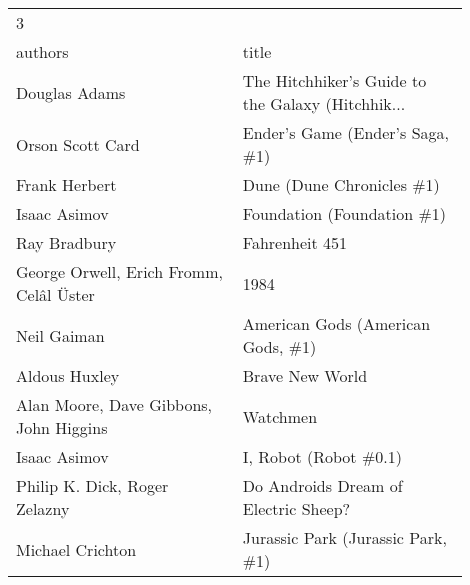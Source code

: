 \begin{tabular}{p{0.45\linewidth}p{0.45\linewidth}}
\toprule
                                       3 \\
                                 authors &                                              title \\
\midrule
                           Douglas Adams &  The Hitchhiker's Guide to the Galaxy (Hitchhik... \\
                        Orson Scott Card &                    Ender's Game (Ender's Saga, \#1) \\
                           Frank Herbert &                          Dune (Dune Chronicles \#1) \\
                            Isaac Asimov &                         Foundation (Foundation \#1) \\
                            Ray Bradbury &                                     Fahrenheit 451 \\
 George Orwell, Erich Fromm, Celâl Üster &                                               1984 \\
                             Neil Gaiman &                  American Gods (American Gods, \#1) \\
                           Aldous Huxley &                                    Brave New World \\
  Alan Moore, Dave Gibbons, John Higgins &                                           Watchmen \\
                            Isaac Asimov &                              I, Robot (Robot \#0.1) \\
           Philip K. Dick, Roger Zelazny &               Do Androids Dream of Electric Sheep? \\
                        Michael Crichton &                  Jurassic Park (Jurassic Park, \#1) \\
\bottomrule
\end{tabular}
